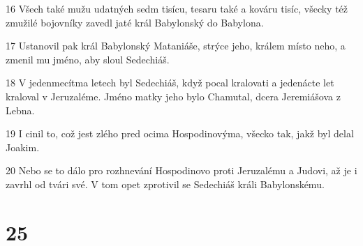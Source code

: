 \par 16 Všech také mužu udatných sedm tisícu, tesaru také a kováru tisíc, všecky též zmužilé bojovníky zavedl jaté král Babylonský do Babylona.
\par 17 Ustanovil pak král Babylonský Mataniáše, strýce jeho, králem místo neho, a zmenil mu jméno, aby sloul Sedechiáš.
\par 18 V jedenmecítma letech byl Sedechiáš, když pocal kralovati a jedenácte let kraloval v Jeruzaléme. Jméno matky jeho bylo Chamutal, dcera Jeremiášova z Lebna.
\par 19 I cinil to, což jest zlého pred ocima Hospodinovýma, všecko tak, jakž byl delal Joakim.
\par 20 Nebo se to dálo pro rozhnevání Hospodinovo proti Jeruzalému a Judovi, až je i zavrhl od tvári své. V tom opet zprotivil se Sedechiáš králi Babylonskému.

\chapter{25}

